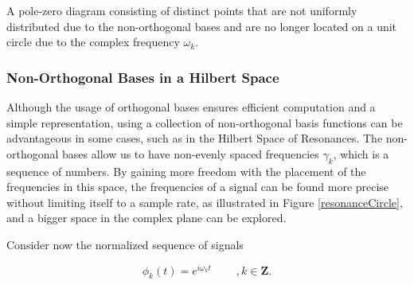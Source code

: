 \begin{marginfigure}
\centering

\caption{A pole-zero diagram consisting of distinct points that are not uniformly distributed due to the non-orthogonal bases and are no longer located on a unit circle due to the complex frequency $\omega_k$.}
\label{resonanceCircle} \vspace{3cm}
\end{marginfigure}

\subsubsection{Non-Orthogonal Bases in a Hilbert Space}

Although the usage of orthogonal bases ensures efficient computation and a simple representation, using a collection of non-orthogonal basis functions can be advantageous in some cases, such as in the Hilbert Space of Resonances. The non-orthogonal bases allow us to have non-evenly spaced frequencies $\gamma_k$, which is a sequence of numbers. By gaining more freedom with the placement of the frequencies in this space, the frequencies of a signal can be found more precise without limiting itself to a sample rate, as illustrated in Figure \ref{resonanceCircle}, and a bigger space in the complex plane can be explored.

Consider now the normalized sequence of signals




\begin{equation}
    \phi_k(t) = e^{i \omega_k t}  \; \; \; \; \; \; \; \; , k \in \mathbf{Z}.
\end{equation}

